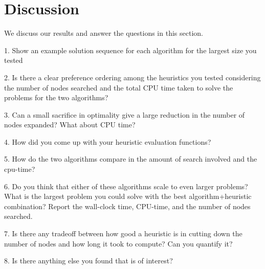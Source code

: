 \section{Discussion}

We discuss our results and answer the questions in this section.

1. Show an example solution sequence for each algorithm for the largest size you tested

2. Is there a clear preference ordering among the heuristics you tested considering the number of nodes searched and the total CPU time taken to solve the problems for the two algorithms?

3. Can a small sacrifice in optimality give a large reduction in the number of nodes expanded? What about CPU time?

4. How did you come up with your heuristic evaluation functions?

5. How do the two algorithms compare in the amount of search involved and the cpu-time?

6. Do you think that either of these algorithms scale to even larger problems? What is the largest problem you could solve with the best algorithm+heuristic combination? Report the wall-clock time, CPU-time, and the number of nodes searched.

7. Is there any tradeoff between how good a heuristic is in cutting down the number of nodes and how long it took to compute? Can you quantify it?

8. Is there anything else you found that is of interest?


